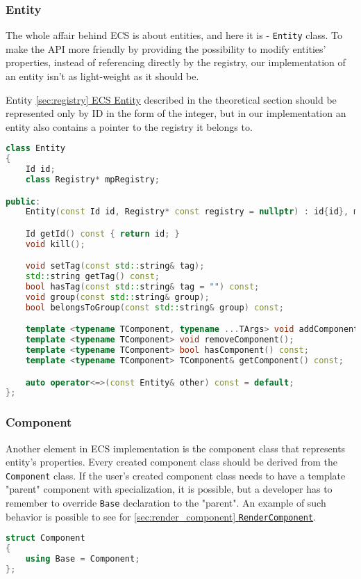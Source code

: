 \newpage

\subsubsection{Entity}
\hspace{\parindent}
The whole affair behind ECS is about entities, and here it is - \texttt{Entity} class.
To make the API more friendly by providing the possibility to modify entities' properties, instead of referencing directly by the registry, our implementation of an entity isn't as light-weight as it should be.

Entity \hyperref[sec:registry]{\ref*{sec:registry} ECS Entity} described in the theoretical section should be represented only by ID in the form of the integer, but in our implementation an entity also contains a pointer to the registry it belongs to.
\begin{lstlisting}[language=c++, caption=\texttt{Entity} class (./engine/include/tsengine/ecs/ecs.h)]
class Entity
{
    Id id;
    class Registry* mpRegistry;

public:
    Entity(const Id id, Registry* const registry = nullptr) : id{id}, mpRegistry{registry} {}

    Id getId() const { return id; }
    void kill();

    void setTag(const std::string& tag);
    std::string getTag() const;
    bool hasTag(const std::string& tag = "") const;
    void group(const std::string& group);
    bool belongsToGroup(const std::string& group) const;

    template <typename TComponent, typename ...TArgs> void addComponent(TArgs&& ...args);
    template <typename TComponent> void removeComponent();
    template <typename TComponent> bool hasComponent() const;
    template <typename TComponent> TComponent& getComponent() const;

    auto operator<=>(const Entity& other) const = default;
};
\end{lstlisting}

\newpage

\subsubsection{Component}
\hspace{\parindent}
Another element in ECS implementation is the component class that represents entity's properties.
Every created component class should be derived from the \texttt{Component} class. If the user's created component class needs to have a template "parent" component with specialization, it is possible, but a developer has to remember to override \texttt{Base} declaration to the "parent". An example of such behavior is possible to see for \hyperref[sec:render_component]{\ref*{sec:render_component} \texttt{RenderComponent}}.
\begin{lstlisting}[language=c++, caption=\texttt{Component} class (./engine/include/tsengine/ecs/ecs.h)]
struct Component
{
    using Base = Component;
};
\end{lstlisting}

